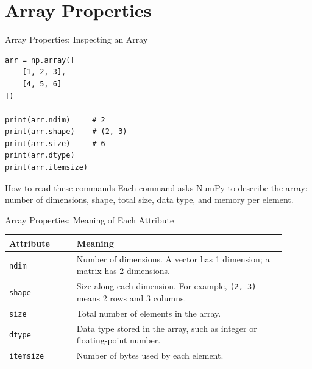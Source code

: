 \documentclass[aspectratio=169,11pt]{beamer}
\begin{document}
\section{Array Properties}

\begin{frame}[fragile]{Array Properties: Inspecting an Array}
\small
\begin{lstlisting}[style=py]
arr = np.array([
    [1, 2, 3],
    [4, 5, 6]
])

print(arr.ndim)     # 2
print(arr.shape)    # (2, 3)
print(arr.size)     # 6
print(arr.dtype)
print(arr.itemsize)
\end{lstlisting}
\begin{block}{How to read these commands}
Each command asks NumPy to describe the array: number of dimensions, shape, total size, data type, and memory per element.
\end{block}
\end{frame}

\begin{frame}{Array Properties: Meaning of Each Attribute}
\small
\begin{tabular}{p{0.22\linewidth}p{0.68\linewidth}}
\toprule
\textbf{Attribute} & \textbf{Meaning} \\
\midrule
\texttt{ndim} & Number of dimensions. A vector has 1 dimension; a matrix has 2 dimensions. \\
\texttt{shape} & Size along each dimension. For example, \texttt{(2, 3)} means 2 rows and 3 columns. \\
\texttt{size} & Total number of elements in the array. \\
\texttt{dtype} & Data type stored in the array, such as integer or floating-point number. \\
\texttt{itemsize} & Number of bytes used by each element. \\
\bottomrule
\end{tabular}
\end{frame}
\end{document}
